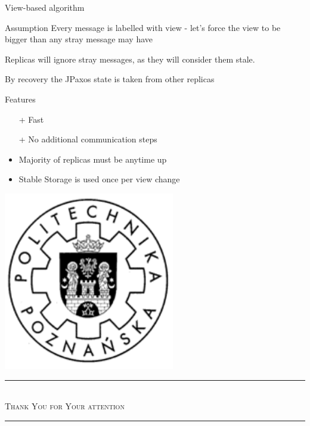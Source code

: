 \documentclass[hyperref={pdfpagelabels=true},11pt,compress,trans]{beamer}
\begin{document}
\begin{frame}{View-based algorithm}
 \begin{block}{Assumption}
  Every message is labelled with view - let's force the view to be bigger than any stray message may have

  Replicas will ignore stray messages, as they will consider them stale.

  By recovery the JPaxos state is taken from other replicas
 \end{block}
 \begin{block}{Features}
  \vspace{-1em}\vspace{-\parskip}\vspace{-\lineskip}
  \begin{itemize}
   \item[+]  Fast
   \item[+]  No additional communication steps
   \item     Majority of replicas must be anytime up
   \item     Stable Storage is used once per view change
  \end{itemize}
 \end{block}
\end{frame}

{
 \logo
{
  \includegraphics[keepaspectratio,height=0.2\textheight]{images/put_logo.pdf} \hspace*{3.5em}
}

\begin{frame}{}
  \rmfamily\Large
  \begin{center}
      \par\noindent\ignorespaces\rule{0.9\textwidth}{0.05em} \\
      \textsc{Thank You for Your attention} \\ \vspace{-\parskip}
      \rule{0.9\textwidth}{0.05em}
  \end{center}
\end{frame}

}
\end{document}
